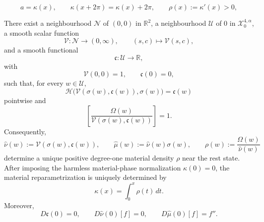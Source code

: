 \documentclass[10pt,a4paper]{amsart}
\begin{document}
\begin{equation}\label{eq2.kappa}
a=\kappa(x),\qquad
\kappa(x+2\pi)=\kappa(x)+2\pi,\qquad
\rho(x):=\kappa'(x)>0,
\end{equation}

\begin{lemma}\label{lem:materialIFT}
There exist a neighbourhood $\mathcal N$ of $(0,0)$ in $\mathbb R^2$, a neighbourhood
$\mathcal U$ of $0$ in $\mathcal X^{4,\alpha}_0$, a smooth scalar function
\[
\mathcal V:\mathcal N\longrightarrow (0,\infty),
\qquad (s,c)\longmapsto \mathcal V(s,c),
\]
and a smooth functional
\[
\mathfrak c:\mathcal U\longrightarrow\mathbb R,
\]
with
\[
\mathcal V(0,0)=1,\qquad \mathfrak c(0)=0,
\]
such that, for every $w\in\mathcal U$,
\begin{equation}\label{eq2.Vdef}
\mathscr H\bigl(\mathcal V(\sigma(w),\mathfrak c(w)),\sigma(w)\bigr)
=\mathfrak c(w)
\end{equation}
pointwise and
\begin{equation}\label{eq2.periodconstraint}
\left[
\frac{\Omega(w)}
{\mathcal V(\sigma(w),\mathfrak c(w))}
\right]=1.
\end{equation}
Consequently,
\begin{equation}\label{eq2.reducedstrains}
\widehat\nu(w)
:=\mathcal V(\sigma(w),\mathfrak c(w)),
\qquad
\widehat\mu(w):=\widehat\nu(w)\sigma(w),
\qquad
\rho(w):=\frac{\Omega(w)}{\widehat\nu(w)}
\end{equation}
determine a unique positive degree-one material density $\rho$ near the rest state.
After imposing the harmless material-phase normalization $\kappa(0)=0$, the material
reparametrization is uniquely determined by
\[
\kappa(x)=\int_0^x\rho(t)\,dt.
\]
Moreover,
\begin{equation}\label{eq2.firstvariations}
D\mathfrak c(0)=0,\qquad
D\widehat\nu(0)[f]=0,\qquad
D\widehat\mu(0)[f]=f''.
\end{equation}
\end{lemma}
\end{document}

